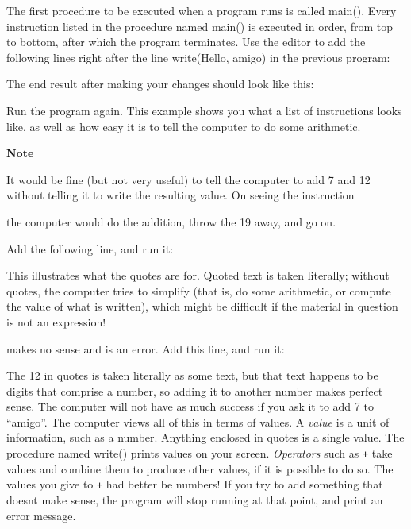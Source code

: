 The first procedure to be executed when a program runs is called
\textsf{main()}. Every instruction listed in the procedure named
\textsf{main()} is executed in order, from top to bottom, after which
the program terminates. Use the editor to add the following lines right
after the line \textsf{write({\textquotedbl}Hello,
amigo{\textquotedbl})} in the previous program:


\noindent The end result after making your changes should look like this:


Run the program again. This example shows you what a list of
instructions looks like, as well as how easy it is to tell the computer
to do some arithmetic.

{\sffamily\bfseries
Note}

{\sffamily
It would be fine (but not very useful) to tell the computer to add 7 and
12 without telling it to write the resulting value. On seeing the
instruction}


\noindent
the computer would do the addition, throw the 19 away, and go on.

Add the following line, and run it:


This illustrates what the quotes are for. Quoted text is taken
literally; without quotes, the computer tries to simplify (that is, do
some arithmetic, or compute the value of what is written), which might
be difficult if the material in question is not an expression!


\noindent makes no sense and is an error. Add this line, and run it:


The 12 in quotes is taken literally as some text, but that text happens
to be digits that comprise a number, so adding it to another number
makes perfect sense. The computer will not have as much success if you
ask it to add 7 to {\textquotedblleft}amigo{\textquotedblright}. The
computer views all of this in terms of values. A \textit{value} is a
unit of information, such as a number. Anything enclosed in quotes is a
single value. The procedure named \textsf{write()}
prints values on your screen. \textit{Operators} such as \texttt{+}
take values and combine them to produce other values, if it is possible
to do so. The values you give to \texttt{+} had better be numbers! If
you try to add something that doesn{\textquotesingle}t make sense, the
program will stop running at that point, and print an error message.

